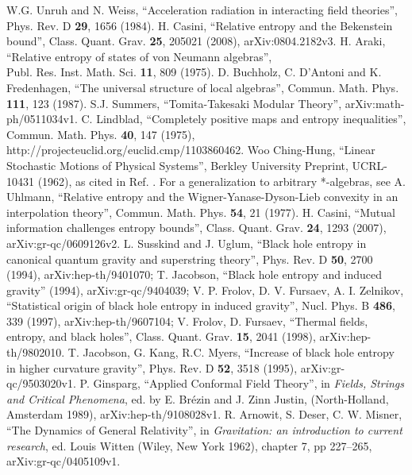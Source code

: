 \documentclass[12pt]{article}
\begin{document}
\begin{thebibliography}{299}
W.G. Unruh and N. Weiss, ``Acceleration radiation in interacting field theories'', Phys. Rev. D \textbf{29}, 1656 (1984).
H. Casini, ``Relative entropy and the Bekenstein bound'', Class. Quant. Grav. \textbf{25}, 205021 (2008), arXiv:0804.2182v3.
H. Araki, ``Relative entropy of states of von Neumann algebras'', \\Publ. Res. Inst. Math. Sci. \textbf{11}, 809 (1975).  %
D. Buchholz, C. D'Antoni and K. Fredenhagen, ``The universal structure of local algebras'', Commun. Math. Phys. \textbf{111}, 123 (1987).
S.J. Summers, ``Tomita-Takesaki Modular Theory'', arXiv:math-ph/0511034v1.
C. Lindblad, ``Completely positive maps and entropy inequalities'', \\Commun. Math. Phys. \textbf{40}, 147 (1975), \\http://projecteuclid.org/euclid.cmp/1103860462.  Woo Ching-Hung, ``Linear Stochastic Motions of Physical Systems'', Berkley University Preprint, UCRL-10431 (1962), as cited in Ref. \cite{sorkin98}.  For a generalization to arbitrary *-algebras, see A. Uhlmann, ``Relative entropy and the Wigner-Yanase-Dyson-Lieb convexity in an interpolation theory'', Commun. Math. Phys. \textbf{54}, 21 (1977).
H. Casini, ``Mutual information challenges entropy bounds'', Class. Quant. Grav. \textbf{24}, 1293 (2007), arXiv:gr-qc/0609126v2.
L. Susskind and J. Uglum, ``Black hole entropy in canonical quantum gravity and superstring theory'', Phys. Rev. D \textbf{50}, 2700 (1994), arXiv:hep-th/9401070; T. Jacobson, ``Black hole entropy and induced gravity'' (1994), arXiv:gr-qc/9404039; V. P. Frolov, D. V. Fursaev, A. I. Zelnikov, ``Statistical origin of black hole entropy in induced gravity'', Nucl. Phys. B \textbf{486}, 339 (1997), arXiv:hep-th/9607104; V. Frolov, D. Fursaev, ``Thermal fields, entropy, and black holes'', Class. Quant. Grav. \textbf{15}, 2041 (1998), arXiv:hep-th/9802010.
T. Jacobson, G. Kang, R.C. Myers, ``Increase of black hole entropy in higher curvature gravity'', Phys. Rev. D \textbf{52}, 3518 (1995), arXiv:gr-qc/9503020v1.
P. Ginsparg, ``Applied Conformal Field Theory'', in \textit{Fields, Strings and Critical Phenomena}, ed. by E. Br\'ezin and J. Zinn Justin, (North-Holland, Amsterdam 1989), arXiv:hep-th/9108028v1.
R. Arnowit, S. Deser, C. W. Misner, ``The Dynamics of General Relativity'', in \textit{Gravitation: an introduction to current research}, ed. Louis Witten (Wiley, New York 1962), chapter 7, pp 227--265, arXiv:gr-qc/0405109v1.

\end{thebibliography}
\end{document}
